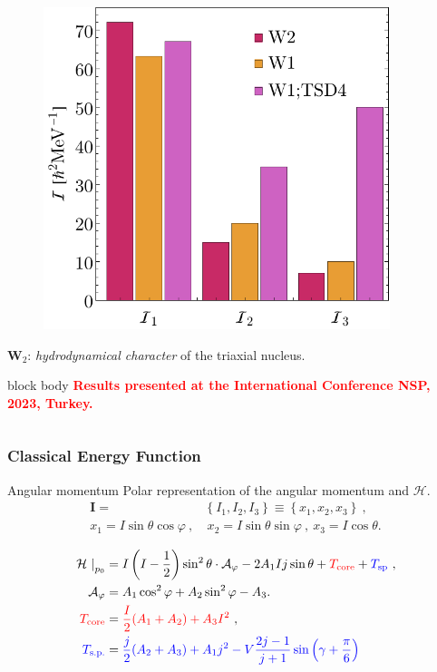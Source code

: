 \documentclass{beamer}
\begin{document}
\begin{frame}
\begin{columns}
\begin{column}{0.5\textwidth}
\begin{figure}
				\includegraphics[width=0.9\textwidth]{figures/parity-partners-plots/W1-W2-Mois.pdf}
			\end{figure}
			\vspace{-0.5cm}
			$\mathbf{W}_2$: \emph{hydrodynamical character} of the triaxial nucleus.
			\begin{beamercolorbox}[rounded=true,shadow=false, wd=\linewidth,]{block body}
				\centering
				\textcolor{red}{\footnotesize{\textbf{Results presented at the International Conference NSP, 2023, Turkey.}}}
			\end{beamercolorbox}
		\end{column}
	\end{columns}
\end{frame}

\begin{frame}
	\frametitle{Classical Energy Function}
	\begin{block}{Angular momentum}
		Polar representation of the angular momentum and $\mathcal{H}$.
		\begin{align}
			\mathbf{I}=&\left\{I_1,I_2,I_3\right\}\equiv\left\{x_1,x_2,x_3\right\}\ ,\nonumber\\
			x_1=I\sin\theta\cos\varphi\ ,&\ x_2=I\sin\theta\sin\varphi\ ,\ x_3=I\cos\theta.\nonumber
		\end{align}
	\end{block}
	\vspace{-0.5cm}
	\begin{align}
		\left. \mathcal{H}\ \right\vert_{p_0}&=I\left(I-\frac{1}{2}\right)\sin^2\theta\cdot \mathcal{A}_\varphi-2A_1Ij\sin\theta+{\color{red}T_\text{core}}+{\color{blue}T_\text{sp}}\ ,\nonumber\\
		\mathcal{A}_\varphi&=A_1\cos^2\varphi+A_2\sin^2\varphi-A_3.\nonumber\\
		{\color{red}T_\text{core}}&={\color{red}\frac{I}{2}(A_1+A_2)+A_3I^2}\ ,\nonumber\\
		{\color{blue}T_\text{s.p.}}&={\color{blue}\frac{j}{2}(A_2+A_3)+A_1j^2-V\frac{2j-1}{j+1}\sin\left(\gamma+\frac{\pi}{6}\right)}\nonumber
	\end{align}
\end{frame}
\end{document}
